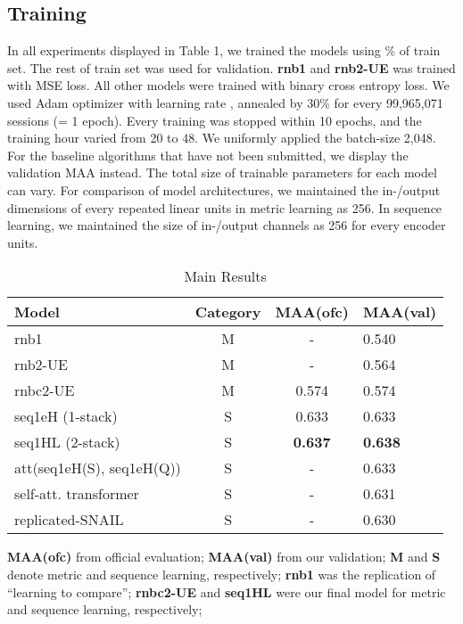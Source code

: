 \subsection{Training}
In all experiments displayed in Table 1, we trained the models using \% of train set. The rest of train set was used for  validation. \textbf{rnb1} and \textbf{rnb2-UE} was trained with MSE loss. All other models were trained with binary cross entropy loss.  We used Adam\cite{kingma2014adam} optimizer with learning rate , annealed by 30\% for every 99,965,071 sessions (= 1 epoch). Every training was stopped within 10 epochs, and the training hour varied from 20 to 48. We uniformly applied the batch-size 2,048. For the baseline algorithms that have not been submitted, we display the validation MAA instead. The total size of  trainable parameters for each model can vary. For comparison of model architectures, we maintained the in-/output dimensions of every repeated linear units in metric learning as 256. In sequence learning, we maintained the size of in-/output channels as 256 for every encoder units.
\begin{table}
\small
\begin{threeparttable}
  \caption{Main Results}
  \label{mainresult}
  \begin{tabular}{lccl}
    \toprule
    Model & Category & MAA(ofc) & MAA(val)\\
    \midrule
    rnb1  & M & - & 0.540\\
    rnb2-UE  & M & - & 0.564\\
    rnbc2-UE & M &0.574 & 0.574\\
    \midrule
    seq1eH (1-stack) & S &0.633 & 0.633\\
    seq1HL (2-stack)& S & \textbf{0.637} & \textbf{0.638}\\
    att(seq1eH(S), seq1eH(Q))& S & -  & 0.633\\
    self-att. transformer & S & -  & 0.631\\
    replicated-SNAIL & S & - &0.630\\
  \bottomrule
\end{tabular}
    \begin{tablenotes}
      \footnotesize
      \item \textbf{MAA(ofc)} from official evaluation; \textbf{MAA(val)} from our validation; \textbf{M} and \textbf{S} denote metric and sequence learning, respectively; \textbf{rnb1} was the replication of ``learning to compare''\cite{sung2018learning}; \textbf{rnbc2-UE} and \textbf{seq1HL} were our final model for metric and sequence learning, respectively; 
      
\end{tablenotes}
\end{threeparttable}
\end{table}

